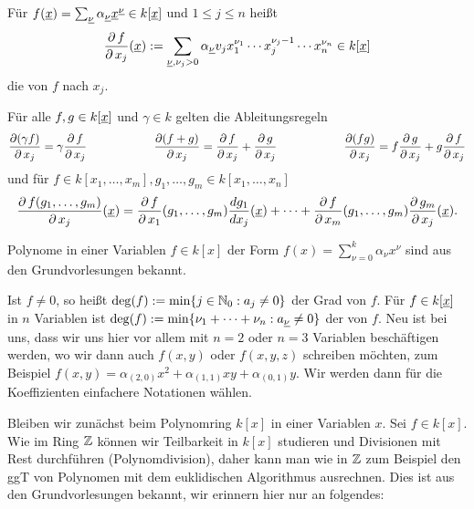 \begin{defn}
	Für $f(\uline{x}) = \sum_{\uline{\nu}} \alpha_{\uline{\nu}} \uline{x}^{\uline{\nu}} \in k[\uline{x}]$ und $1 \leq j \leq n$ heißt
	\[ \frac{\der f}{\der x_j}(\uline{x}) := \sum_{\uline{\nu}, \nu_j > 0} \alpha_{\uline{\nu}} v_j x_1^{\nu_1} \cdots x_j^{\nu_j-1} \cdots x_n^{\nu_n} \in k[\uline{x}] \]
	die  von $f$ nach $x_j$.
\end{defn}

\begin{satz}
\label{satz_7.4}
	Für alle $f,g \in k[\uline{x}]$ und $\gamma \in k$ gelten die Ableitungsregeln
	\[ \frac{\operatorname{\partial}(\gamma f)}{\operatorname{\partial} x_j} = \gamma \frac{\operatorname{\partial} f}{\operatorname{\partial} x_j} \hspace{2cm} \frac{\operatorname{\partial}(f+g)}{\operatorname{\partial} x_j} = \frac{\operatorname{\partial} f}{\operatorname{\partial} x_j} + \frac{\operatorname{\partial} g}{\operatorname{\partial} x_j} \hspace{2cm} \frac{\operatorname{\partial}(fg)}{\operatorname{\partial} x_j} = f \frac{\operatorname{\partial} g}{\operatorname{\partial} x_j} + g \frac{\operatorname{\partial} f}{\operatorname{\partial} x_j} \]
	und für $f \in k[x_1, \dots,x_m], g_1,\dots, g_m \in k[x_1,\dots, x_n]$
	\[ \frac{\der f(g_1,\dots, g_m)}{\der x_j}(\uline{x}) = \frac{\der f}{\der x_1} (g_1,\dots,g_m) \frac{dg_1}{dx_j}(\uline{x}) + \dots + \frac{\der f}{\der x_m} (g_1,\dots,g_m) \frac{\der g_m}{\der x_j}(\uline{x}). \]
\end{satz}

Polynome in einer Variablen $f \in k[x]$ der Form $f(x) = \sum_{\nu = 0}^{k} \alpha_\nu x^\nu$ sind aus den Grundvorlesungen bekannt.
\begin{defn}[Grad]
	Ist $f \neq 0$, so heißt $\deg(f) := \min\{j \in \mathbb{N}_0 : a_j \neq 0\}$ der Grad von $f$. 
	Für $f \in k[\uline{x}]$ in $n$ Variablen ist $\deg(f) := \min\{\nu_1 + \dots + \nu_n : a_{\uline{\nu}} \neq 0\}$ der  von $f$. 
	Neu ist bei uns, dass wir uns hier vor allem mit $n = 2$ oder $n = 3$ Variablen beschäftigen werden, wo wir dann auch $f(x,y)$ oder $f(x,y,z)$ schreiben möchten, zum Beispiel $f(x,y) = \alpha_{(2,0)} x^2 + \alpha_{(1,1)} xy + \alpha_{(0,1)}y$. 
	Wir werden dann für die Koeffizienten einfachere Notationen wählen.
\end{defn}

\begin{bem}
	Bleiben wir zunächst beim Polynomring $k[x]$ in einer Variablen $x$. 
	Sei $f \in k[x]$. 
	Wie im Ring $\mathbb{Z}$ können wir Teilbarkeit in $k[x]$ studieren und Divisionen mit Rest durchführen (Polynomdivision), daher kann man wie in $\mathbb{Z}$ zum Beispiel den ggT von Polynomen mit dem euklidischen Algorithmus ausrechnen. 
	Dies ist aus den Grundvorlesungen bekannt, wir erinnern hier nur an folgendes:
\end{bem}

